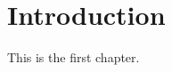 \chapter{Introduction}\label{chapter:introduction}

This is the first chapter.~\cite{Aaboud:2016mmw,Bruning:782076}
